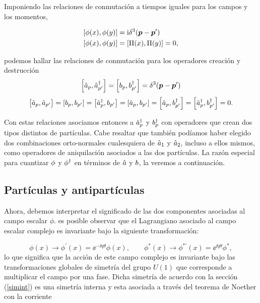 Imponiendo las relaciones de conmutación a tiempos iguales para los campos y los momentos,

\begin{equation}
    \begin{split}
        \comm{\Ophi(x)}{\Ophi(y)} & = \ii \delta^3 \qty(\vb*{p}-\vb*{p}^\prime) \\
        \comm{\Ophi(x)}{\Ophi(y)} & = \comm{\OPi(x)}{\OPi(y)} = 0,
    \end{split}
\end{equation}


podemos hallar las relaciones de conmutación para los operadores creación y destrucción
\begin{equation}
    \comm{\Oa_p}{\Oa_{p^\prime}^\dag} = \comm{\Ob_p}{\Ob_{p^\prime}^\dag}=\delta^3 \qty(\vb*{p}-\vb*{p}^\prime)
\end{equation}
\begin{equation}
    \comm\big{\Oa_p}{\Oa_{p^\prime}}=\comm{\Ob_p}{\Ob_{p^\prime}}=\comm{\Oa^\dag_p}{\Ob_{p^\prime}} = \comm{\Oa_p}{\Ob_{p^\prime}}=\comm{\Oa_p}{\Ob^\dag_{p^\prime}} = \comm{\Oa^\dag_p}{\Ob^\dag_{p^\prime}}=0.
\end{equation}

Con estas relaciones asociamos entonces a $\hat{a}_p^\dag$ y $b_p^\dag$ con operadores que crean dos tipos distintos de partículas. Cabe resaltar que también podíamos haber elegido dos combinaciones orto-normales cualesquiera de $\hat{a}_{1}$ y $\hat{a}_{2}$, incluso a ellos mismos, como operadores de aniquilación asociados a las dos partículas. La razón especial para cuantizar $\phi$ y $\phi^{\dag }$ en términos de $\hat{a}$ y $b$, la veremos a continuación.

\subsection{Partículas y antipartículas}

Ahora, debemos interpretar el significado de las dos componentes asociadas al campo escalar $\phi$. es posible observar que el Lagrangiano asociado al campo escalar complejo es invariante bajo la siguiente transformación:

\begin{equation}
\boxed{
    \phi(x) \to \phi^\prime(x)=\ee^{-\ii q\theta}\phi(x), \quad\quad \phi^* (x) \to \phi^{* \prime }(x)=\ee^{\ii q\theta} \phi^*,}
\end{equation}
lo que significa que la acción de este campo complejo es invariante bajo las transformaciones globales de simetría del grupo $U(1)$ que corresponde a multiplicar el campo por una fase. Dicha simetría de acuerdo con la sección (\ref{simint}) es una simetría interna y esta asociada a través del teorema de Noether con la corriente

